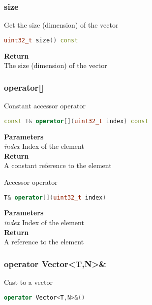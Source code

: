 \subsubsection{size}
\begin{mdframed}
Get the size (dimension) of the vector
\begin{lstlisting}[language=C++]
uint32_t size() const
\end{lstlisting}
\textbf{Return} \\ 
The size (dimension) of the vector\\ 
\end{mdframed}

\subsubsection{operator[]}
\begin{mdframed}
Constant accessor operator
\begin{lstlisting}[language=C++]
const T& operator[](uint32_t index) const
\end{lstlisting}
\textbf{Parameters} \\ 
\textit{index} Index of the element \\ 
\textbf{Return} \\ 
A constant reference to the element\\ 
\end{mdframed}

\begin{mdframed}
Accessor operator
\begin{lstlisting}[language=C++]
T& operator[](uint32_t index)
\end{lstlisting}
\textbf{Parameters} \\ 
\textit{index} Index of the element \\ 
\textbf{Return} \\ 
A reference to the element\\ 
\end{mdframed}

\subsubsection{operator Vector<T,N>\&}
\begin{mdframed}
Cast to a vector
\begin{lstlisting}[language=C++]
operator Vector<T,N>&()
\end{lstlisting}
\end{mdframed}

